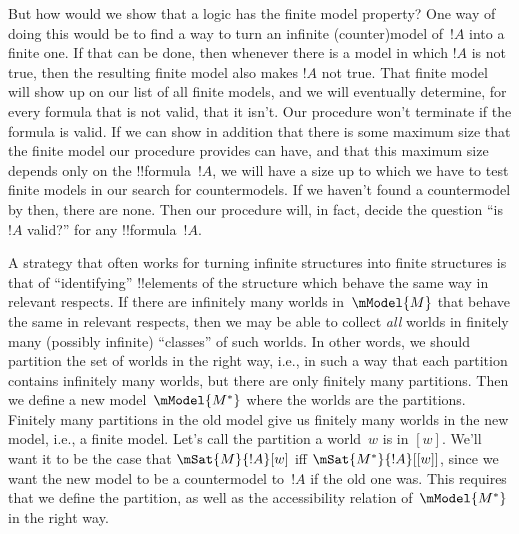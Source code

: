 \documentclass[../../../include/open-logic-section]{subfiles}
\begin{document}
But how would we show that a logic has the finite model property? One
way of doing this would be to find a way to turn an infinite
(counter)model of~$!A$ into a finite one. If that can be done, then
whenever there is a model in which $!A$ is not true, then the
resulting finite model also makes $!A$ not true. That finite model
will show up on our list of all finite models, and we will eventually
determine, for every formula that is not valid, that it isn't. Our
procedure won't terminate if the formula is valid. If we can show in
addition that there is some maximum size that the finite model our
procedure provides can have, and that this maximum size depends only
on the !!{formula}~$!A$, we will have a size up to which we have to
test finite models in our search for countermodels. If we haven't
found a countermodel by then, there are none. Then our procedure will,
in fact, decide the question ``is $!A$ valid?'' for any
!!{formula}~$!A$.

A strategy that often works for turning infinite structures into
finite structures is that of ``identifying'' !!{element}s of the
structure which behave the same way in relevant respects. If there are
infinitely many worlds in~$\mModel{M}$ that behave the same in
relevant respects, then we may be able to collect \emph{all} worlds in
finitely many (possibly infinite) ``classes'' of such worlds. In other
words, we should partition the set of worlds in the right way, i.e.,
in such a way that each partition contains infinitely many worlds, but
there are only finitely many partitions. Then we define a new
model~$\mModel{M^*}$ where the worlds are the partitions. Finitely
many partitions in the old model give us finitely many worlds in the
new model, i.e., a finite model. Let's call the partition a world~$w$
is in $[w]$. We'll want it to be the case that $\mSat{M}{!A}[w]$ iff
$\mSat{M^*}{!A}[{[w]}]$, since we want the new model to be a
countermodel to~$!A$ if the old one was. This requires that we define
the partition, as well as the accessibility relation of~$\mModel{M^*}$
in the right way.
\end{document}
